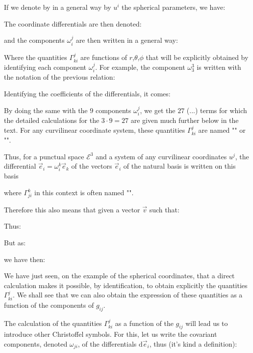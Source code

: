 	If we denote by in a general way by $u^i$ the spherical parameters, we have:
	
	The coordinate differentials are then denoted:
	
	and the components $\omega_i^j$ are then written in a general way:
	
	Where the quantities $\Gamma_{ki}^j$ are functions of $r$,$\theta$,$\phi$ that will be explicitly obtained by identifying each component $\omega_i^j$. For example, the component $\omega_3^3$ is written with the notation of the previous relation:
	
	Identifying the coefficients of the differentials, it comes:
	
	By doing the same with the $9$ components $\omega_i^j$, we get the $27$ (...) terms for which the detailed calculations for the $3\cdot 9=27$ are given much further below in the text. For any curvilinear coordinate system, these quantities $\Gamma_{ki}^j$ are named "\label{Christoffel symbols of the second kind}" or "".
	
	Thus, for a punctual space $\mathcal{E}^3$ and a system of any curvilinear coordinates $u^j$, the differential $\mathrm{}\vec{e}_i=\omega_i^k\vec{e}_k$ of the vectors $\vec{e}_i$ of the natural basis is written on this basis
	 
	where $\Gamma_{ji}^k$ in this context is often named "".
	\begin{tcolorbox}[title=Remark,colframe=black,arc=10pt]
	Therefore this also means that given a vector $\vec{v}$ such that:
	
	Thus:
	
	But as:
	
	we have then:
	
	\end{tcolorbox}
	We have just seen, on the example of the spherical coordinates, that a direct calculation makes it possible, by identification, to obtain explicitly the quantities $\Gamma_{ki}^j$. We shall see that we can also obtain the expression of these quantities as a function of the components of $g_{ij}$.
	
	The calculation of the quantities $\Gamma_{ki}^j$ as a function of the $g_{ij}$ will lead us to introduce other Christoffel symbols. For this, let us write the covariant components, denoted $\omega_{ji}$, of the differentials $\mathrm{d}\vec{e}_i$, thus (it's kind a definition):
	
